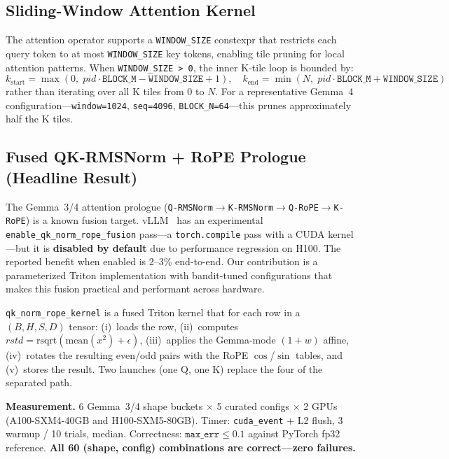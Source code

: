 \documentclass[11pt]{article}
\begin{document}
\subsection{Sliding-Window Attention Kernel}
\label{sec:swa-kernel}

The attention operator supports a \texttt{WINDOW\_SIZE} constexpr that restricts
each query token to at most \texttt{WINDOW\_SIZE} key tokens, enabling tile
pruning for local attention patterns. When \texttt{WINDOW\_SIZE > 0}, the inner
K-tile loop is bounded by:
\[
k_\text{start} = \max(0,\; \mathit{pid} \cdot \texttt{BLOCK\_M} - \texttt{WINDOW\_SIZE} + 1), \quad
k_\text{end} = \min(N,\; \mathit{pid} \cdot \texttt{BLOCK\_M} + \texttt{WINDOW\_SIZE})
\]
rather than iterating over all K tiles from 0 to $N$. For a representative
Gemma~4 configuration---\texttt{window=1024}, \texttt{seq=4096},
\texttt{BLOCK\_N=64}---this prunes approximately half the K tiles.


\subsection{Fused QK-RMSNorm + RoPE Prologue (Headline Result)}
\label{sec:fused-prologue}

The Gemma~3/4 attention prologue
(\texttt{Q-RMSNorm}$\to$\texttt{K-RMSNorm}$\to$\texttt{Q-RoPE}$\to$\texttt{K-RoPE})
is a known fusion target. vLLM~\citep{vllm} has an experimental
\texttt{enable\_qk\_norm\_rope\_fusion} pass---a \texttt{torch.compile} pass with a
CUDA kernel---but it is \textbf{disabled by default} due to performance regression
on H100. The reported benefit when enabled is 2--3\% end-to-end. Our
contribution is a parameterized Triton implementation with bandit-tuned
configurations that makes this fusion practical and performant across hardware.

\texttt{qk\_norm\_rope\_kernel} is a fused Triton kernel that for each row in a
$(B, H, S, D)$ tensor: (i)~loads the row, (ii)~computes
$\mathit{rstd} = \text{rsqrt}(\text{mean}(x^2) + \epsilon)$, (iii)~applies the
Gemma-mode $(1+w)$ affine, (iv)~rotates the resulting even/odd pairs with the
RoPE $\cos$/$\sin$ tables, and (v)~stores the result. Two launches (one Q, one
K) replace the four of the separated path.

\textbf{Measurement.} 6 Gemma~3/4 shape buckets $\times$ 5 curated configs
$\times$ 2 GPUs (A100-SXM4-40GB and H100-SXM5-80GB). Timer:
\texttt{cuda\_event} + L2 flush, 3 warmup / 10 trials, median. Correctness:
$\texttt{max\_err} \leq 0.1$ against PyTorch fp32 reference. \textbf{All 60
(shape, config) combinations are correct---zero failures.}
\end{document}
